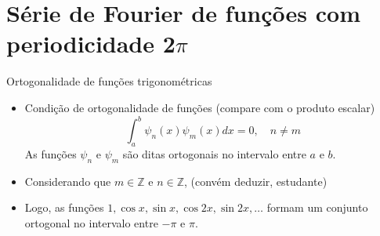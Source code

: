    \section[ slide = true ]{Série de Fourier de funções com periodicidade 2$\pi$}
      \begin{slide}[toc=]{Ortogonalidade de funções trigonométricas}
         \begin{itemize}
		 \item Condição de ortogonalidade de funções \alert{(compare com o produto escalar)}
		    \begin{equation*}
			    \int_a^b \psi_n(x)\psi_m(x) dx = 0,\quad  n\neq m
		    \end{equation*}
			 As funções $\psi_n$ e $\psi_m$ são ditas ortogonais no intervalo entre $a$ e $b$.\\ \pause
		 \item Considerando que $m\in \mathbb{Z}$ e $n\in \mathbb{Z}$, \alert{(convém deduzir, estudante)}
			 \pause
		\item Logo, as funções $1, \cos x, \sin x, \cos 2x, \sin 2x, \dots$ formam um conjunto ortogonal no intervalo entre $-\pi$ e $\pi$.
	\end{itemize}         
      \end{slide}
      
